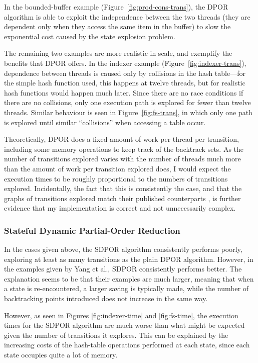 \documentclass[12pt,a4paper,twoside,openright]{report}
\begin{document}
In the bounded-buffer example
(Figure~\ref{fig:prod-cons-trans}),
the DPOR algorithm is able to exploit
the independence between the two threads
(they are dependent only when they
access the same item in the buffer) to
slow the
exponential cost caused by the
state explosion problem.

The remaining two examples are more
realistic in scale, and exemplify the
benefits that DPOR offers.
In the indexer example
(Figure~\ref{fig:indexer-trans}),
dependence between
threads is caused only by collisions
in the hash table---for the simple
hash function used, this happens at twelve threads,
but for realistic hash functions would
happen much later. Since there are no
race conditions if there are no collisions,
only one execution path
is explored for fewer than twelve threads.
Similar behaviour is seen in
Figure~\ref{fig:fs-trans}, in which only
one path is explored until similar ``collisions''
when accessing a table occur.

Theoretically, DPOR does a fixed amount of
work per thread per transition, including some
memory operations to keep track of the backtrack
sets. As the number of transitions explored
varies with
the number of threads much more than the amount
of work per transition explored does, I would
expect the execution times to be roughly
proportional to the numbers of transitions
explored. Incidentally, the fact that this is consistently
the case, and that the graphs of transitions
explored match their published counterparts
\cite{flan05},
is further evidence that my
implementation is correct and not
unnecessarily complex.

\subsubsection{Stateful Dynamic Partial-Order Reduction}
In the cases given above, the SDPOR algorithm
consistently performs poorly, exploring at
least as many transitions as the plain
DPOR algorithm. However, in the examples
given by Yang et al.\@ \cite{yang08},
SDPOR consistently performs better.
The explanation seems to be that
their examples are much larger, meaning
that when a state is re-encountered,
a larger saving is typically made,
while the number of backtracking
points introduced does not increase
in the same way.

However, as seen in Figures
\ref{fig:indexer-time} and \ref{fig:fs-time},
the execution times for the SDPOR algorithm
are much worse than what might be
expected given the number of
transitions it explores.
This can be explained by the increasing
costs of the hash-table operations
performed at each state, since each
state occupies quite a lot of memory.
\end{document}
